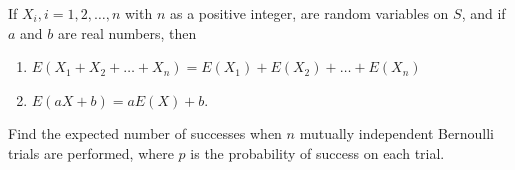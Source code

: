 \begin{thm}
If \(X_i, i = 1, 2, \ldots, n\) with \(n\) as a positive integer, are random variables on \(S\), and if \(a\) and \(b\) are real numbers, then
\begin{enumerate}
    \item \(E(X_1 + X_2 + \ldots + X_n) = E(X_1) + E(X_2) + \ldots + E(X_n)\)
    \item \(E(aX + b) = aE(X) + b\).
\end{enumerate}

\end{thm}
\begin{exmp}
Find the expected number of successes when $n$ mutually independent Bernoulli trials are performed,
where $p$ is the probability of success on each trial.
\end{exmp}


